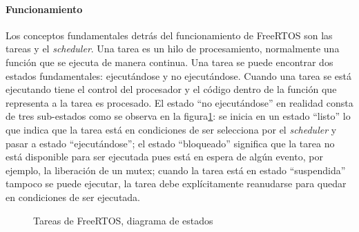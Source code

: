 \documentclass[11pt,letterpaper]{article}
\begin{document}
\paragraph{Funcionamiento}
Los conceptos fundamentales detrás del funcionamiento de FreeRTOS son las tareas y el \textit{scheduler}. Una tarea es un hilo de procesamiento, normalmente una función que se ejecuta de manera continua. Una tarea se puede encontrar dos estados fundamentales: ejecutándose y no ejecutándose. Cuando una tarea se está ejecutando tiene el control del procesador y el código dentro de la función que representa a la tarea es procesado. El estado ``no ejecutándose'' en realidad consta de tres sub-estados como se observa en la figura\ref{task_state}: se inicia en un estado ``listo'' lo que indica que la tarea está en condiciones de ser selecciona por el \textit{scheduler} y pasar a estado ``ejecutándose''; el estado ``bloqueado'' significa que la tarea no está disponible para ser ejecutada pues está en espera de algún evento, por ejemplo, la liberación de un mutex; cuando la tarea está en estado ``suspendida'' tampoco se puede ejecutar, la tarea debe explícitamente reanudarse para quedar en condiciones de ser ejecutada.

\begin{figure}[ht!]
\centering
{}
\caption{Tareas de FreeRTOS, diagrama de estados}\label{task_state}
\end{figure}
\end{document}
